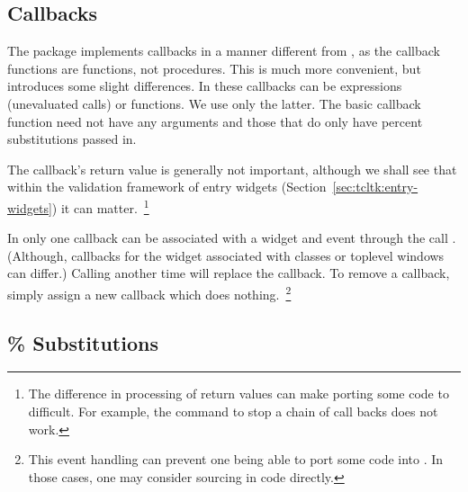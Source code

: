 \subsection{Callbacks}
\label{sec:tcltk:callbacks}

The  package implements callbacks in a manner different
from \TK, as the callback functions are \R\/ functions, not \TK\/
procedures. This is much more convenient, but introduces some slight
differences.  In  these callbacks can be expressions
(unevaluated calls) or functions. We use only the latter. The basic
callback function need not have any arguments and those that do only
have percent substitutions passed in.


The callback's return value is generally not important, although we
shall see that within the validation framework of entry widgets
(Section~\ref{sec:tcltk:entry-widgets}) it can matter.~\footnote{The
  difference in processing of return values can make porting some
  \Tk\/ code to  difficult. For example, the 
  command to stop a chain of call backs does not work.}



In  only one callback can be associated with a widget and
event through the call
. (Although, callbacks for the
widget associated with classes or toplevel windows can differ.)
Calling  another time will replace the callback. To
remove a callback, simply assign a new callback which does
nothing.~\footnote{This event handling can prevent one being able to port
  some \Tk\/ code into . In those cases, one may consider
  sourcing in \Tcl\/ code directly.}



\subsection{\% Substitutions}
\label{sec:tcltk-percent-substitutions}

